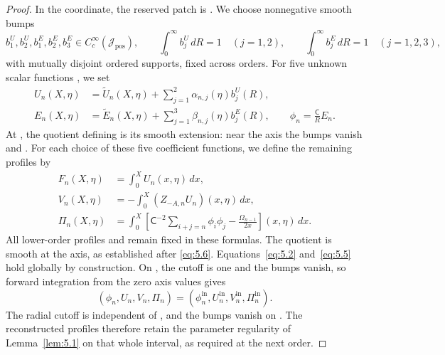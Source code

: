 \begin{proof}
In the  coordinate, the reserved patch  is
. We choose nonnegative smooth bumps
\[
b_1^U,b_2^U,b_1^E,b_2^E,b_3^E\in C_c^\infty(\mathcal J_{\mathrm{pos}}),
\qquad
\int_0^\infty b_j^U\,dR=1\quad(j=1,2),
\qquad
\int_0^\infty b_j^E\,dR=1\quad(j=1,2,3),
\]
%
with mutually disjoint ordered supports, fixed across orders. For five unknown scalar functions
, we set
\begin{equation}\label{eq:5.14}
\begin{aligned}
U_n(X,\eta)&=\widetilde U_n(X,\eta)+\sum_{j=1}^{2}\alpha_{n,j}(\eta)b_j^U(R),\\
E_n(X,\eta)&=\widetilde E_n(X,\eta)+\sum_{j=1}^{3}\beta_{n,j}(\eta)b_j^E(R),
\qquad
\phi_n=\frac{\mathsf C}{R}E_n.
\end{aligned}
\tag{5.14}
\end{equation}
At , the quotient defining  is its smooth extension: near the axis the bumps
vanish and . For each choice of these five coefficient functions, we define the remaining
profiles by
\begin{equation}\label{eq:5.15}
\begin{aligned}
F_n(X,\eta)&=\int_0^XU_n(x,\eta)\,dx,\\
V_n(X,\eta)&=-\int_0^X(Z_{-A,n}U_n)(x,\eta)\,dx,\\
\Pi_n(X,\eta)&=\int_0^X\left[\mathsf C^{-2}\sum_{i+j=n}\phi_i\phi_j-\frac{\Omega_{n-1}}{2x}\right](x,\eta)\,dx.
\end{aligned}
\tag{5.15}
\end{equation}
All lower-order profiles and  remain fixed in these formulas. The quotient
 is smooth at the axis, as established after \eqref{eq:5.6}.
Equations~\eqref{eq:5.2} and~\eqref{eq:5.5} hold globally by construction. On
, the cutoff is one and the bumps vanish, so forward integration from the zero axis values gives
\[
(\phi_n,U_n,V_n,\Pi_n)
=(\phi_n^{\mathrm{in}},U_n^{\mathrm{in}},V_n^{\mathrm{in}},\Pi_n^{\mathrm{in}}).
\]
The radial cutoff is independent of , and the bumps vanish on
. The reconstructed profiles therefore retain the parameter regularity of
Lemma~\ref{lem:5.1} on that whole interval, as required at the next order.


\end{proof}
